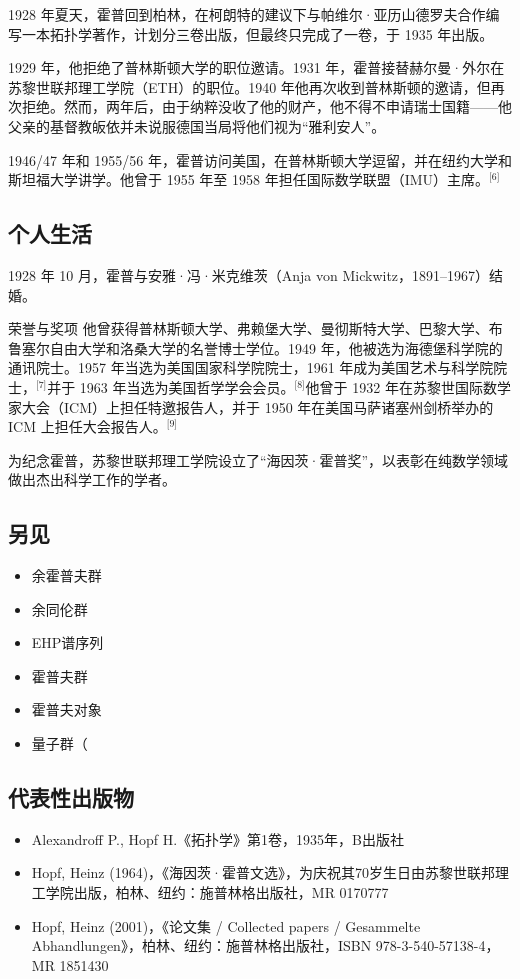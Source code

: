 1928 年夏天，霍普回到柏林，在柯朗特的建议下与帕维尔·亚历山德罗夫合作编写一本拓扑学著作，计划分三卷出版，但最终只完成了一卷，于 1935 年出版。

1929 年，他拒绝了普林斯顿大学的职位邀请。1931 年，霍普接替赫尔曼·外尔在苏黎世联邦理工学院（ETH）的职位。1940 年他再次收到普林斯顿的邀请，但再次拒绝。然而，两年后，由于纳粹没收了他的财产，他不得不申请瑞士国籍——他父亲的基督教皈依并未说服德国当局将他们视为“雅利安人”。

1946/47 年和 1955/56 年，霍普访问美国，在普林斯顿大学逗留，并在纽约大学和斯坦福大学讲学。他曾于 1955 年至 1958 年担任国际数学联盟（IMU）主席。\(^\text{[6]}\)
\subsection{个人生活}
1928 年 10 月，霍普与安雅·冯·米克维茨（Anja von Mickwitz，1891–1967）结婚。

荣誉与奖项
他曾获得普林斯顿大学、弗赖堡大学、曼彻斯特大学、巴黎大学、布鲁塞尔自由大学和洛桑大学的名誉博士学位。1949 年，他被选为海德堡科学院的通讯院士。1957 年当选为美国国家科学院院士，1961 年成为美国艺术与科学院院士，\(^\text{[7]}\)并于 1963 年当选为美国哲学学会会员。\(^\text{[8]}\)他曾于 1932 年在苏黎世国际数学家大会（ICM）上担任特邀报告人，并于 1950 年在美国马萨诸塞州剑桥举办的 ICM 上担任大会报告人。\(^\text{[9]}\)

为纪念霍普，苏黎世联邦理工学院设立了“海因茨·霍普奖”，以表彰在纯数学领域做出杰出科学工作的学者。
\subsection{另见}
\begin{itemize}
\item 余霍普夫群
\item 余同伦群
\item EHP谱序列
\item 霍普夫群
\item 霍普夫对象
\item 量子群（
\end{itemize}
\subsection{代表性出版物}
\begin{itemize}
\item Alexandroff P., Hopf H.《拓扑学》第1卷，1935年，B出版社
\item Hopf, Heinz (1964)，《海因茨·霍普文选》，为庆祝其70岁生日由苏黎世联邦理工学院出版，柏林、纽约：施普林格出版社，MR 0170777
\item Hopf, Heinz (2001)，《论文集 / Collected papers / Gesammelte Abhandlungen》，柏林、纽约：施普林格出版社，ISBN 978-3-540-57138-4，MR 1851430
\end{itemize}
